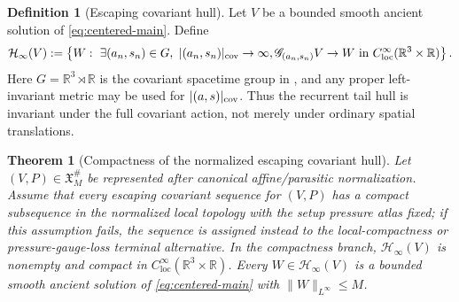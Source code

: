 \documentclass[11pt]{amsart}
\numberwithin{equation}{section}
\theoremstyle{plain}
\newtheorem{theorem}{Theorem}[section]
\theoremstyle{definition}
\newtheorem{definition}[definition]{Definition}
\theoremstyle{remark}
\newcommand{\R}{\mathbb R}
\newcommand{\loc}{\mathrm{loc}}
\newcommand{\calH}{\mathcal H}
\begin{document}
\begin{definition}[Escaping covariant hull]
\label{def:escaping-covariant-hull}
Let \(V\) be a bounded smooth ancient solution of \eqref{eq:centered-main}.
Define
\[
   \calH_\infty(V)
   :=
   \left\{
      W:\ \exists (a_n,s_n)\in G,\ |(a_n,s_n)|_{\rm cov}\to\infty,
      \mathscr G_{(a_n,s_n)}V\to W
      \text{ in } C^\infty_{\loc}(\R^3\times\R)
   \right\}.
\]
Here \(G=\mathbb R^3\rtimes\mathbb R\) is the covariant spacetime group in
, and any proper left-invariant metric may be
used for \(|(a,s)|_{\rm cov}\).  Thus the recurrent tail hull is invariant
under the full covariant action, not merely under ordinary spatial translations.
\end{definition}

\begin{theorem}[Compactness of the normalized escaping covariant hull]
\label{thm:escaping-covariant-hull-compactness}
Let \((V,P)\in\mathfrak X_M^\#\) be represented after canonical
affine/parasitic normalization.  Assume that every escaping covariant sequence
for \((V,P)\) has a compact subsequence in the normalized local topology with
the setup pressure atlas fixed; if this assumption fails, the sequence is
assigned instead to the local-compactness or pressure-gauge-loss terminal
alternative.  In the compactness branch, \(\calH_\infty(V)\) is nonempty and
compact in \(C^\infty_{\loc}(\R^3\times\R)\).  Every
\(W\in\calH_\infty(V)\) is a bounded smooth ancient solution of
\eqref{eq:centered-main} with
\(\|W\|_{L^\infty}\le M\).
\end{theorem}
\end{document}
